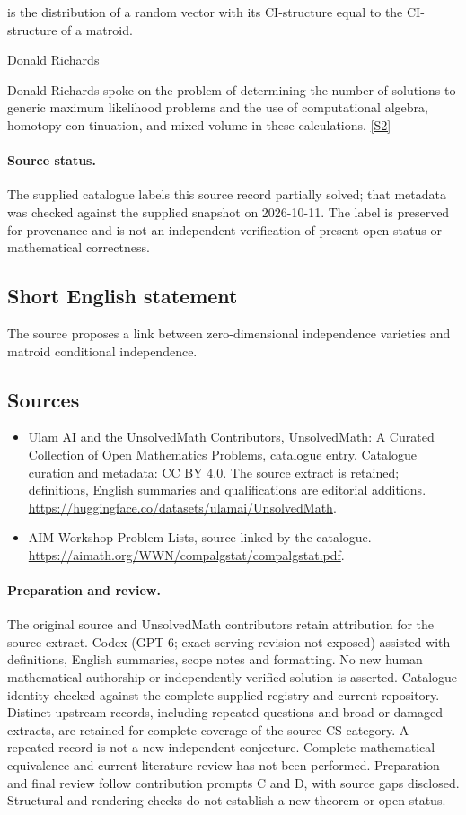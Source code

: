 \documentclass[11pt]{article}
\newcommand{\sref}[2]{\hyperlink{source:#1:#2}{[S#2]}}
\begin{document}
is the distribution of a random vector with its CI-structure equal to the CI-structure of a matroid.

Donald Richards

Donald Richards spoke on the problem of determining the number of solutions to generic maximum likelihood problems and the use of computational algebra, homotopy con-tinuation, and mixed volume in these calculations. \sref{statement}{2}
\paragraph{Source status.}
The supplied catalogue labels this source record partially solved; that metadata was checked against the supplied snapshot on 2026-10-11. The label is preserved for provenance and is not an independent verification of present open status or mathematical correctness.
\subsection{Short English statement}
The source proposes a link between zero-dimensional independence varieties and matroid conditional independence.
\subsection{Sources}
\begin{itemize}
\item[\hypertarget{source:statement:1}{S1}] Ulam AI and the UnsolvedMath Contributors, UnsolvedMath: A Curated Collection of Open Mathematics Problems, catalogue entry. Catalogue curation and metadata: CC BY 4.0. The source extract is retained; definitions, English summaries and qualifications are editorial additions.
\url{https://huggingface.co/datasets/ulamai/UnsolvedMath}.
\item[\hypertarget{source:statement:2}{S2}] AIM Workshop Problem Lists, source linked by the catalogue.
\url{https://aimath.org/WWN/compalgstat/compalgstat.pdf}.
\end{itemize}
\paragraph{Preparation and review.}
The original source and UnsolvedMath contributors retain attribution for the source extract. Codex (GPT-6; exact serving revision not exposed) assisted with definitions, English summaries, scope notes and formatting. No new human mathematical authorship or independently verified solution is asserted. Catalogue identity checked against the complete supplied registry and current repository. Distinct upstream records, including repeated questions and broad or damaged extracts, are retained for complete coverage of the source CS category. A repeated record is not a new independent conjecture. Complete mathematical-equivalence and current-literature review has not been performed. Preparation and final review follow contribution prompts C and D, with source gaps disclosed. Structural and rendering checks do not establish a new theorem or open status.
\label{end:statement}
\end{document}
